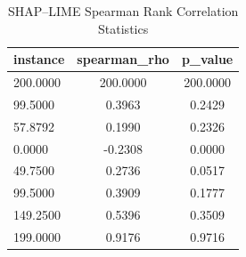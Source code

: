 \begin{table}
\centering
\caption{SHAP–LIME Spearman Rank Correlation Statistics}
\label{tab:agreement}
\begin{tabular}{lcc}
\toprule
instance & spearman_rho & p_value \\
\midrule
200.0000 & 200.0000 & 200.0000 \\
99.5000 & 0.3963 & 0.2429 \\
57.8792 & 0.1990 & 0.2326 \\
0.0000 & -0.2308 & 0.0000 \\
49.7500 & 0.2736 & 0.0517 \\
99.5000 & 0.3909 & 0.1777 \\
149.2500 & 0.5396 & 0.3509 \\
199.0000 & 0.9176 & 0.9716 \\
\bottomrule
\end{tabular}
\end{table}
